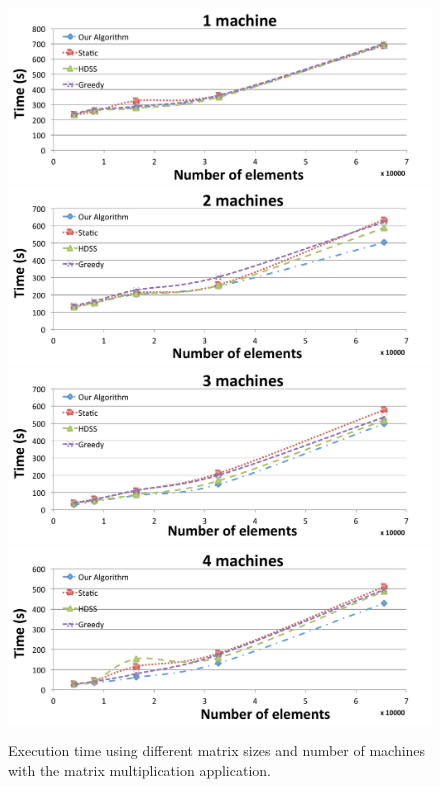 \documentclass[journal]{IEEEtran}
\begin{document}
\begin{figure}[htb]
	\begin{center}
	\centering
		\includegraphics[scale=0.3]{1machine.pdf} \quad
		\includegraphics[scale=0.3]{2machines.pdf} \quad
		\includegraphics[scale=0.3]{3machines.pdf} \quad
		\includegraphics[scale=0.3]{4machines.pdf} 
	\caption{Execution time using different matrix sizes and number of
          machines with the matrix multiplication application.}
	\label{fig:todosJuntos}
	\end{center}
\end{figure}
\end{document}
